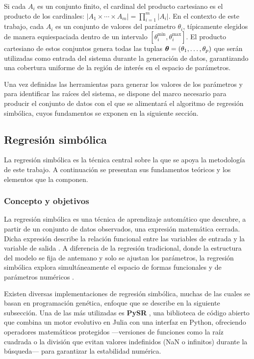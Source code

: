 \documentclass[12pt,a4paper]{article} \usepackage[utf8]{inputenc} \usepackage[spanish]{babel} \usepackage{amsmath, amssymb, amsthm} \usepackage{bm} \usepackage{float} \usepackage{longtable} \usepackage[hidelinks]{hyperref}
\begin{document}
Si cada \(A_i\) es un conjunto finito, el cardinal del producto cartesiano es el producto de los cardinales: \(|A_1 \times \cdots \times A_m| = \prod_{i=1}^m |A_i|\). En el contexto de este trabajo, cada \(A_i\) es un conjunto de valores del parámetro \(\theta_i\), típicamente elegidos de manera equiespaciada dentro de un intervalo \([\theta_i^{\min}, \theta_i^{\max}]\). El producto cartesiano de estos conjuntos genera todas las tuplas \(\boldsymbol{\theta} = (\theta_1, \dots, \theta_p)\) que serán utilizadas como entrada del sistema durante la generación de datos, garantizando una cobertura uniforme de la región de interés en el espacio de parámetros.

Una vez definidas las herramientas para generar los valores de los parámetros y para identificar las raíces del sistema, se dispone del marco necesario para producir el conjunto de datos con el que se alimentará el algoritmo de regresión simbólica, cuyos fundamentos se exponen en la siguiente sección.

\subsection{Regresión simbólica}
\label{sec:regresion}

La regresión simbólica es la técnica central sobre la que se apoya la metodología de este trabajo. A continuación se presentan sus fundamentos teóricos y los elementos que la componen.

\subsubsection{Concepto y objetivos}

La regresión simbólica es una técnica de aprendizaje automático que descubre, a partir de un conjunto de datos observados, una expresión matemática cerrada. Dicha expresión describe la relación funcional entre las variables de entrada y la variable de salida \cite{koza1992genetic}. A diferencia de la regresión tradicional, donde la estructura del modelo se fija de antemano y solo se ajustan los parámetros, la regresión simbólica explora simultáneamente el espacio de formas funcionales y de parámetros numéricos \cite{schmidt2009distilling}.

Existen diversas implementaciones de regresión simbólica, muchas de las cuales se basan en programación genética, enfoque que se describe en la siguiente subsección. Una de las más utilizadas es \textbf{PySR} \cite{cranmer2023pysr}, una biblioteca de código abierto que combina un motor evolutivo en Julia con una interfaz en Python, ofreciendo operadores matemáticos protegidos ---versiones de funciones como la raíz cuadrada o la división que evitan valores indefinidos (NaN o infinitos) durante la búsqueda--- para garantizar la estabilidad numérica.
\end{document}
